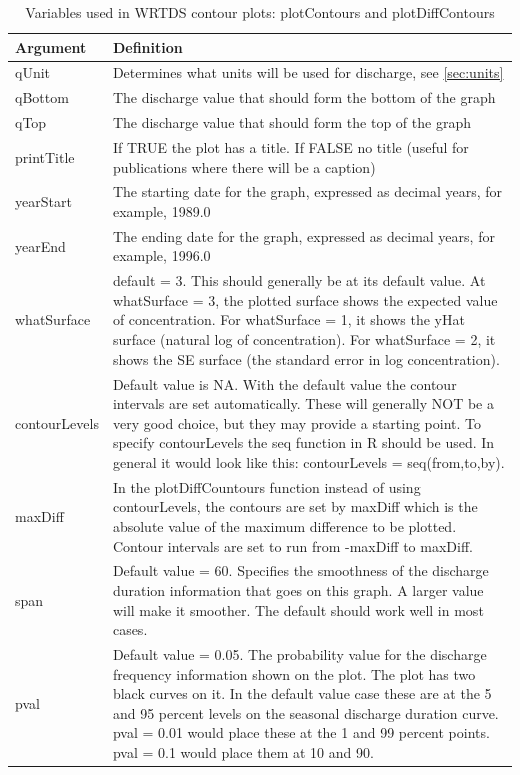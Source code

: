 \documentclass[a4paper,11pt]{article}\usepackage{graphicx, color}
\begin{document}
\begin{table}[ht]
\caption{Variables used in WRTDS contour plots: plotContours and plotDiffContours \label{tab:wrtdsContourVariables}}
\begin{tabularx}{\textwidth}{lX}
\hline
  \textbf{Argument} & \textbf{Definition} \\
\hline
qUnit & Determines what units will be used for discharge, see \ref{sec:units}\\
qBottom & The discharge value that should form the bottom of the graph \\
qTop & The discharge value that should form the top of the graph \\
printTitle & If TRUE the plot has a title.  If FALSE no title (useful for publications where there will be a caption) \\
yearStart & The starting date for the graph, expressed as decimal years, for example, 1989.0 \\
yearEnd & The ending date for the graph, expressed as decimal years, for example, 1996.0 \\
whatSurface & default = 3.  This should generally be at its default value.  At whatSurface = 3, the plotted surface shows the expected value of concentration.  For whatSurface = 1, it shows the yHat surface (natural log of concentration).  For whatSurface = 2, it shows the SE surface (the standard error in log concentration).    \\
contourLevels & Default value is NA.  With the default value the contour intervals are set automatically.  These will generally NOT be a very good choice, but they may provide a starting point.  To specify contourLevels the seq function in R should be used.  In general it would look like this: contourLevels = seq(from,to,by).\\
maxDiff & In the plotDiffCountours function instead of using contourLevels, the contours are set by maxDiff which is the absolute value of the maximum difference to be plotted.  Contour intervals are set to run from -maxDiff to maxDiff.\\
span & Default value = 60.  Specifies the smoothness of the discharge duration information that goes on this graph.  A larger value will make it smoother.  The default should work well in most cases.\\
pval & Default value = 0.05.  The probability value for the discharge frequency information shown on the plot.  The plot has two black curves on it.  In the default value case these are at the 5 and 95 percent levels on the seasonal discharge duration curve.  pval = 0.01 would place these at the 1 and 99 percent points.  pval = 0.1 would place them at 10  and 90.\\

\end{tabularx}
\end{table}
\end{document}
